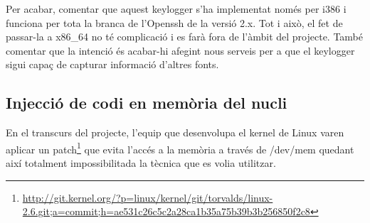 Per acabar, comentar que aquest keylogger s'ha implementat només per i386 i funciona per tota la branca 
de l'Openssh de la versió 2.x. Tot i això, el fet de passar-la a x86\_64 no té complicació i es farà fora de 
l'àmbit del projecte. També comentar que la intenció és acabar-hi afegint nous serveis per a que el keylogger
sigui capaç de capturar informació d'altres fonts.

\subsection{Injecció de codi en memòria del nucli}
En el transcurs del projecte, l'equip que desenvolupa el kernel de Linux varen aplicar un 
patch\footnote{\href{Patch que evita l'ús de /dev/mem per accedir a la memòria}{http://git.kernel.org/?p=linux/kernel/git/torvalds/linux-2.6.git;a=commit;h=ae531c26c5c2a28ca1b35a75b39b3b256850f2c8}} que evita
l'accés a la memòria a través de /dev/mem quedant així totalment impossibilitada la tècnica que es volia 
utilitzar. 

